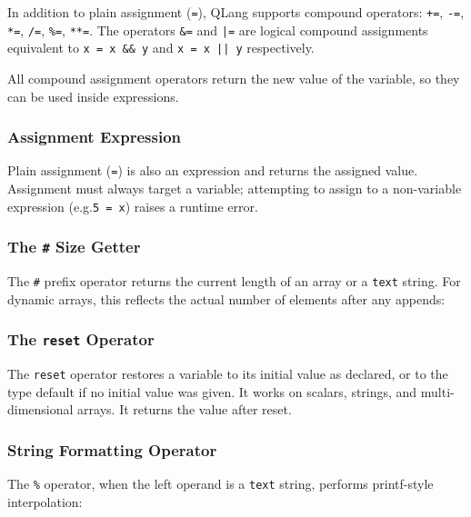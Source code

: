 In addition to plain assignment (\texttt{=}), QLang supports compound
operators: \texttt{+=}, \texttt{-=}, \texttt{*=}, \texttt{/=}, \texttt{\%=},
\texttt{**=}. The operators \texttt{\&=} and \texttt{|=} are logical compound
assignments equivalent to \texttt{x = x \&\& y} and \texttt{x = x || y}
respectively.

All compound assignment operators return the new value of the variable,
so they can be used inside expressions.

\subsubsection{Assignment Expression}

Plain assignment (\texttt{=}) is also an expression and returns the assigned
value. Assignment must always target a variable; attempting to assign to a
non-variable expression (e.g.\@ \texttt{5 = x}) raises a runtime error.

\subsubsection{The \texttt{\#} Size Getter}

The \texttt{\#} prefix operator returns the current length of an array or a
\texttt{text} string. For dynamic arrays, this reflects the actual number of
elements after any appends:



\subsubsection{The \texttt{reset} Operator}

The \texttt{reset} operator restores a variable to its initial value as
declared, or to the type default if no initial value was given. It works on
scalars, strings, and multi-dimensional arrays. It returns the value after
reset.



\subsubsection{String Formatting Operator}

The \texttt{\%} operator, when the left operand is a \texttt{text} string,
performs printf-style interpolation:


